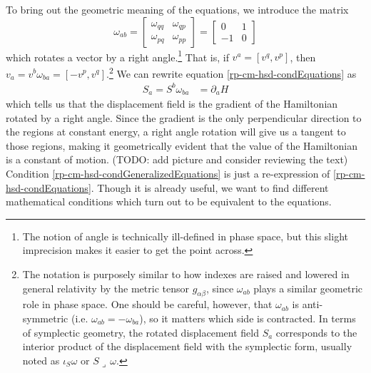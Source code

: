 To bring out the geometric meaning of the equations, we introduce the matrix
\begin{equation}\label{rp-cm-symplectic1d}
	\tag{SF-1D}
	\omega_{ab} = \left[\begin{array}{cc}
		\omega_{qq} & \omega_{qp} \\
		\omega_{pq} & \omega_{pp} 
	\end{array} \right]= \left[\begin{array}{cc}
		0 & 1 \\
		-1 & 0 
	\end{array} \right]
\end{equation}
which rotates a vector by a right angle.\footnote{The notion of angle is technically ill-defined in phase space, but this slight imprecision makes it easier to get the point across.} That is, if $v^a = [v^q, v^p]$, then $v_a = v^b \omega_{ba}  = [-v^p, v^q]$.\footnote{The notation is purposely similar to how indexes are raised and lowered in general relativity by the metric tensor $g_{\alpha\beta}$, since $\omega_{ab}$ plays a similar geometric role in phase space. One should be careful, however, that $\omega_{ab}$ is anti-symmetric (i.e. $\omega_{ab} = - \omega_{ba}$), so it matters which side is contracted. In terms of symplectic geometry, the rotated displacement field $S_a$ corresponds to the interior product of the displacement field with the symplectic form, usually noted as $\iota_S \omega$ or $S \lrcorner \, \omega$.} We can rewrite equation \ref{rp-cm-hsd-condEquations} as
\begin{equation}\label{rp-cm-hsd-condGeneralizedEquations}
	\tag{HM-G}
	\begin{aligned}
		S_a = S^b \omega_{ba} &= \partial_a H 
	\end{aligned}
\end{equation}
which tells us that the displacement field is the gradient of the Hamiltonian rotated by a right angle. Since the gradient is the only perpendicular direction to the regions at constant energy, a right angle rotation will give us a tangent to those regions, making it geometrically evident that the value of the Hamiltonian is a constant of motion. (TODO: add picture and consider reviewing the text) Condition \ref{rp-cm-hsd-condGeneralizedEquations} is just a re-expression of \ref{rp-cm-hsd-condEquations}. Though it is already useful, we want to find different mathematical conditions which turn out to be equivalent to the equations.

